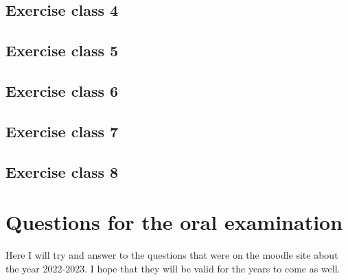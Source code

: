 \documentclass{report}
\begin{document}
\subsection{Exercise class 4}
\subsection{Exercise class 5}
\subsection{Exercise class 6}
\subsection{Exercise class 7}
\subsection{Exercise class 8}
\section{Questions for the oral examination}
Here I will try and answer to the questions that were on the moodle site about the year 2022-2023. I hope that they will be valid for the years to come as well.
\end{document}
